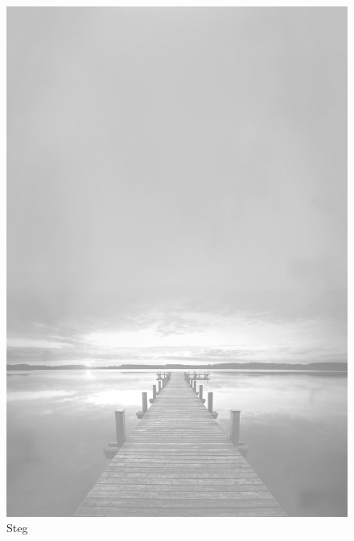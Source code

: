 \documentclass[ngerman,a4paper,11pt]{scrreprt}
\begin{document}
\begin{figure}[H]
\centering
\includegraphics[width=\textwidth,height=.8\textheight,keepaspectratio]{Bilder/Bilder/750_0010_15649__Steg.png}
\caption{\label{img_Steg}Steg}
\end{figure}
\end{document}

